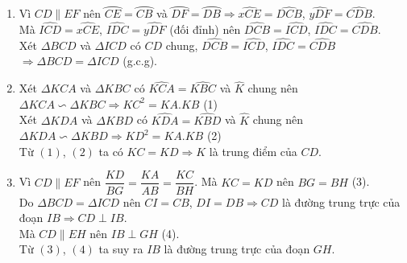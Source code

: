 \begin{ex}
{\begin{center}
\begin{tikzpicture}
\end{tikzpicture}
\end{center}
\begin{enumerate}
\item Vì $CD\parallel EF$ nên $\wideparen{CE}=\wideparen{CB}$ và $\wideparen{DF}=\wideparen{DB}\Rightarrow \widehat{xCE}=\widehat{DCB}$, $\widehat{yDF}=\widehat{CDB}$.\\
Mà $\widehat{ICD}=\widehat{xCE}$, $\widehat{IDC}=\widehat{yDF}$ (đối đỉnh) nên $\widehat{DCB}=\widehat{ICD}$, $\widehat{IDC}=\widehat{CDB}$.\\
Xét $\Delta BCD$ và $\Delta ICD$ có $CD$ chung, $\widehat{DCB}=\widehat{ICD}$, $\widehat{IDC}=\widehat{CDB}$\\
$\Rightarrow \Delta BCD=\Delta ICD$ (g.c.g).
\item Xét $\Delta KCA$ và $\Delta KBC$ có $\widehat{KCA}=\widehat{KBC}$ và $\widehat{K}$ chung nên\\
$\Delta KCA\backsim\Delta KBC\Rightarrow KC^{2}=KA.KB$ (1)\\
Xét $\Delta KDA$ và $\Delta KBD$ có $\widehat{KDA}=\widehat{KBD}$ và $\widehat{K}$ chung nên\\
$\Delta KDA\backsim\Delta KBD\Rightarrow KD^{2}=KA.KB$ (2)\\
Từ $(1)$, $(2)$ ta có $KC=KD\Rightarrow K$ là trung điểm của $CD$.
\item Vì $CD\parallel EF$ nên $\dfrac{KD}{BG}=\dfrac{KA}{AB}=\dfrac{KC}{BH}$. Mà $KC=KD$ nên $BG=BH$ (3).\\
Do $\Delta BCD=\Delta ICD$ nên $CI=CB$, $DI=DB\Rightarrow CD$ là đường trung trực của đoạn $IB\Rightarrow CD\perp IB$.\\
Mà $CD\parallel EH$ nên $IB\perp GH$ (4).\\
Từ $(3)$, $(4)$ ta suy ra $IB$ là đường trung trực của đoạn $GH$.
\end{enumerate}
}
\end{ex}
